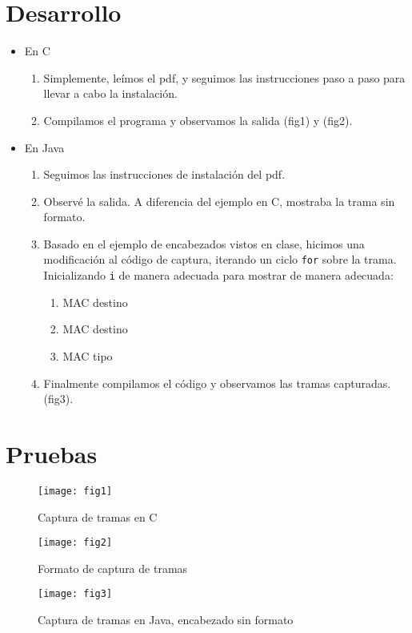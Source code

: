 \documentclass[a4paper,12pt]{article}
\begin{document}
\section{Desarrollo}
\begin{itemize}
\item En C
\begin{enumerate}
\item Simplemente, leímos el pdf, y seguimos las instrucciones paso a paso para llevar a cabo la instalación.
\item Compilamos el programa y observamos la salida (fig1) y (fig2).
\end{enumerate}
\item En Java
\begin{enumerate}
\item Seguimos las instrucciones de instalación del pdf.
\item Observé la salida. A diferencia del ejemplo en C, mostraba la trama sin formato.
\item Basado en el ejemplo de encabezados vistos en clase, hicimos una modificación al código de captura, iterando un ciclo \texttt{for} sobre la trama. Inicializando \texttt{i} de manera adecuada para mostrar de manera adecuada:
\begin{enumerate}
\item MAC destino
\item MAC destino
\item MAC tipo
\end{enumerate}
\item Finalmente compilamos el código y observamos las tramas capturadas. (fig3).
\end{enumerate} 
\end{itemize}
\section{Pruebas}
\begin{figure}[h]
\center
\texttt{[image: fig1]}
\caption{Captura de tramas en C}
\end{figure}
\begin{figure}[h]
\center
\texttt{[image: fig2]}
\caption{Formato de captura de tramas}
\end{figure}

\begin{figure}[h]
\center
\texttt{[image: fig3]}
\caption{Captura de tramas en Java, encabezado sin formato}
\end{figure}
\end{document}
